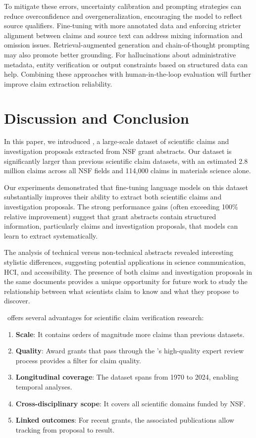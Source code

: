 \documentclass[11pt]{article}
\begin{document}
To mitigate these errors, uncertainty calibration and prompting strategies can reduce overconfidence and overgeneralization, encouraging the model to reflect source qualifiers. Fine-tuning with more annotated data and enforcing stricter alignment between claims and source text can address mixing information and omission issues. Retrieval-augmented generation and chain-of-thought prompting may also promote better grounding. For hallucinations about administrative metadata, entity verification or output constraints based on structured data can help. Combining these approaches with human-in-the-loop evaluation will further improve claim extraction reliability.


\section{Discussion and Conclusion}

In this paper, we introduced \DatasetName, a large-scale dataset of scientific claims and investigation proposals extracted from NSF grant abstracts. Our dataset is significantly larger than previous scientific claim datasets, with an estimated 2.8 million claims across all NSF fields and 114,000 claims in materials science alone.

Our experiments demonstrated that fine-tuning language models on this dataset substantially improves their ability to extract both scientific claims and investigation proposals. The strong performance gains (often exceeding 100\% relative improvement) suggest that grant abstracts contain structured information, particularly claims and investigation proposals, that models can learn to extract systematically.

The analysis of technical versus non-technical abstracts revealed interesting stylistic differences, suggesting potential applications in science communication, HCI, and accessibility. The presence of both claims and investigation proposals in the same documents provides a unique opportunity for future work to study the relationship between what scientists claim to know and what they propose to discover.

\DatasetName~offers several advantages for scientific claim verification research:
\begin{enumerate}[noitemsep,topsep=0pt]
\item \textbf{Scale}: It contains orders of magnitude more claims than previous datasets.
\item \textbf{Quality}: Award grants that pass through the \NSF's high-quality expert review process provides a filter for claim quality.
\item \textbf{Longitudinal coverage}: The dataset spans from 1970 to 2024, enabling temporal analyses.
\item \textbf{Cross-disciplinary scope}: It covers all scientific domains funded by NSF.
\item \textbf{Linked outcomes}: For recent grants, the associated publications allow tracking from proposal to result.
\end{enumerate}
\end{document}
